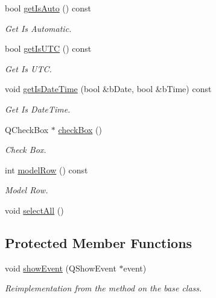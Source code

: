 \begin{DoxyCompactItemize}
bool \hyperlink{class_custom_time_ctrl_a98ae9f9f769258df322419ce26ac7778}{getIsAuto} () const 
\begin{DoxyCompactList}\small\item\em Get Is Automatic. \item\end{DoxyCompactList}\item 
bool \hyperlink{class_custom_time_ctrl_a13d9d91b005bf7e9a585d5a49bba248c}{getIsUTC} () const 
\begin{DoxyCompactList}\small\item\em Get Is UTC. \item\end{DoxyCompactList}\item 
void \hyperlink{class_custom_time_ctrl_a87f05c08ece39484cbad24441f890d3c}{getIsDateTime} (bool \&bDate, bool \&bTime) const 
\begin{DoxyCompactList}\small\item\em Get Is DateTime. \item\end{DoxyCompactList}\item 
QCheckBox $\ast$ \hyperlink{class_custom_time_ctrl_a733c68c7cf18771530e05c55c0a2e3c0}{checkBox} ()
\begin{DoxyCompactList}\small\item\em Check Box. \item\end{DoxyCompactList}\item 
int \hyperlink{class_custom_time_ctrl_a3232a13b5a09af8d908162f5a3369f4c}{modelRow} () const 
\begin{DoxyCompactList}\small\item\em Model Row. \item\end{DoxyCompactList}\item 
void \hyperlink{class_custom_time_ctrl_afa92090a2fc9c052f5a03dd4440f29fc}{selectAll} ()
\end{DoxyCompactItemize}
\subsection*{Protected Member Functions}
\begin{DoxyCompactItemize}
\item 
void \hyperlink{class_custom_time_ctrl_a32f81c6822f07b034d7291a4792bb936}{showEvent} (QShowEvent $\ast$event)
\begin{DoxyCompactList}\small\item\em Reimplementation from the method on the base class. \item\end{DoxyCompactList}\end{DoxyCompactItemize}
